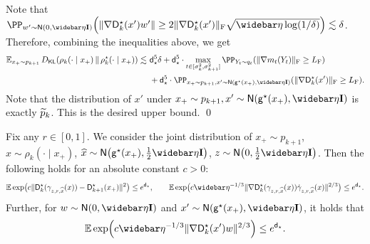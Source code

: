 Note that $\PP_{w'\sim \normal{0, \etabar\Id}}\prn*{ \nrm{\nabla \Ds_k(x')w'}\geq 2\nrmF{\nabla \Ds_k(x')}\sqrt{\etabar\log(1/\delta)} }\leqsim \delta$. Therefore, combining the inequalities above, we get
\begin{align*}
    \En_{x_+\sim p_{k+1}} \Dkl{\rho_k(\cdot\mid x_+)}{\rhostar_k(\cdot\mid x_+)} 
    \leqsim
    &~\dstar^5\delta +\dstar^5\cdot \max_{t\in[\sigma_k^2,\sigma_{k+1}^2]}\PP_{Y_t\sim q_t}\prn*{\nrmF{\nabla m_t(Y_t)}\geq \LF}\\
    &~+\dstar^5\cdot \PP_{x_+\sim p_{k+1}, x'\sim \normal{\gds(x_+), \etabar\Id}}\prn*{\nrmF{\nabla \Ds_k(x')}\geq \LF}.
\end{align*}
Note that the distribution of $x'$ under $x_+\sim p_{k+1}, x'\sim \normal{\gds(x_+), \etabar\Id}$ is exactly $\widetilde{p}_k$. 
This is the desired upper bound.
\qed

\begin{lemma}\label{lem:sub-exponential-bounds}
Fix any $r\in[0,1]$. We consider the joint distribution of $x_+\sim p_{k+1}$, $x\sim \rho_k(\cdot\mid x_+)$, $\xhat\sim \normal{\gds(x_+),\frac12\etabar\Id}$, $z\sim \normal{0,\frac12\etabar\Id}$. Then the following holds for an absolute constant $c>0$:
\begin{align*}
    \En\exp\prn[\big]{ c\nrm{\Ds_k(\gamma_{z,r,\xhat}(x))-\Ds_{k+1}(x_+)}^2 }\leq e^{\dbar}, \qquad
    \En\exp\prn[\big]{ c\etabar ^{-1/3}\nrm{\nabla \Ds_k(\gamma_{z,r,\xhat}(x)) \dot \gamma_{z,r,\xhat}(x)}^{2/3} }\leq e^{\dbar}.
\end{align*}
Further, for $w\sim \normal{0,\etabar\Id}$ and $x'\sim \normal{\gds(x_+),\etabar\Id}$, it holds that
\begin{align*}
    \En\exp\prn*{ c\etabar ^{-1/3}\nrm{\nabla \Ds_k(x')w}^{2/3} }\leq e^{\dbar}.
\end{align*}
\end{lemma}

